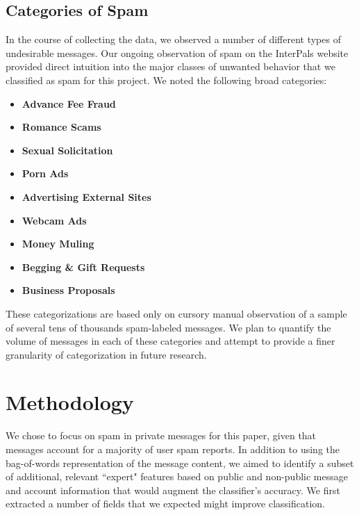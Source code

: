 \documentclass[preprint]{acm_proc_article-sp}
\begin{document}
\subsection{Categories of Spam}

In the course of collecting the data, we observed a number of different types of 
undesirable messages. Our ongoing observation of spam on the InterPals website provided 
direct intuition into the major classes of unwanted behavior that we classified as spam for 
this project. We noted the following broad categories:

\begin{itemize}
\item \textbf{Advance Fee Fraud} 
\item \textbf{Romance Scams} 
\item \textbf{Sexual Solicitation}
\item \textbf{Porn Ads}
\item \textbf{Advertising External Sites}
\item \textbf{Webcam Ads}
\item \textbf{Money Muling}
\item \textbf{Begging \& Gift Requests}
\item \textbf{Business Proposals}
\end{itemize}

These categorizations are based only on cursory manual observation of a sample of several tens of thousands 
spam-labeled messages. We plan to quantify the volume of messages in each of these categories and 
attempt to provide a finer granularity of categorization in future research. 


\section{Methodology}

We chose to focus on spam in private messages for this paper, given that messages account for 
a majority of user spam reports. In addition to using the bag-of-words representation of 
the message content, we aimed to identify a subset of additional, relevant ``expert" features 
based on public and non-public message and account information that would augment the classifier's 
accuracy. We first extracted a number of fields that we expected might improve classification. 
\end{document}
